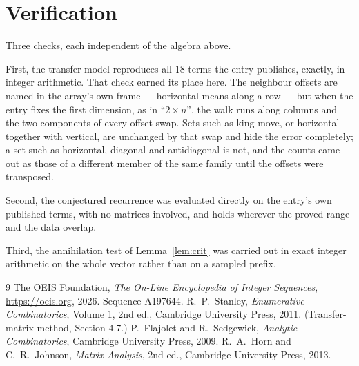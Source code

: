 \documentclass[11pt,a4paper]{article}
\theoremstyle{plain}
\theoremstyle{definition}
\begin{document}
\section{Verification}

Three checks, each independent of the algebra above.

First, the transfer model reproduces all $18$ terms the entry publishes, exactly, in
integer arithmetic. That check earned its place here. The neighbour offsets are named in the
array's own frame --- horizontal means along a row --- but when the entry fixes the first
dimension, as in ``$2\times n$'', the walk runs along columns and the two components of every
offset swap. Sets such as king-move, or horizontal together with vertical, are unchanged by
that swap and hide the error completely; a set such as horizontal, diagonal and antidiagonal
is not, and the counts came out as those of a different member of the same family until the
offsets were transposed.

Second, the conjectured recurrence was evaluated directly on the entry's own published terms,
with no matrices involved, and holds wherever the proved range and the data overlap.

Third, the annihilation test of Lemma~\ref{lem:crit} was carried out in exact integer
arithmetic on the whole vector rather than on a sampled prefix.

\begin{thebibliography}{9}
 The OEIS Foundation, \emph{The On-Line Encyclopedia of Integer
Sequences}, \url{https://oeis.org}, 2026. Sequence A197644.
 R.~P.~Stanley, \emph{Enumerative Combinatorics}, Volume 1, 2nd ed.,
Cambridge University Press, 2011. (Transfer-matrix method, Section 4.7.)
 P.~Flajolet and R.~Sedgewick, \emph{Analytic Combinatorics}, Cambridge
University Press, 2009.
 R.~A.~Horn and C.~R.~Johnson, \emph{Matrix Analysis}, 2nd ed., Cambridge
University Press, 2013.
\end{thebibliography}
\end{document}
